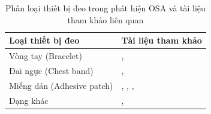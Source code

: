 \begin{table}[htbp]
    \centering
    \caption{Phân loại thiết bị đeo trong phát hiện OSA và tài liệu tham khảo liên quan}
    \label{tab:wearable_types}
    \begin{tabular}{|p{5.5cm}|p{7.5cm}|}
        \hline
        \textbf{Loại thiết bị đeo} & \textbf{Tài liệu tham khảo} \\
        \hline
        Vòng tay (Bracelet) & \cite{jeon2020realtime}, \cite{shen2022mtcnn} \cite{e3hst} \cite{osa_sanchez2025} \\
        \hline
        Đai ngực (Chest band) & \cite{svmHSt2017}, \cite{chen2024hdc} \cite{e3hst} \cite{osa_sanchez2025} \\
        \hline
        Miếng dán (Adhesive patch) & \cite{Vu2025SleepPosition}, \cite{yeo2022resnet}, \cite{yeo2022respiratory}, \cite{p_3} \cite{osa_sanchez2025}\\
        \hline
        Dạng khác & \cite{Sleep_Posture_Detection}, \cite{hst_wear_paper} \cite{osa_sanchez2025} \cite{hstSurvey} \cite{hst_paper} \cite{hst_wear_paper}\\
        \hline
    \end{tabular}
\end{table}




